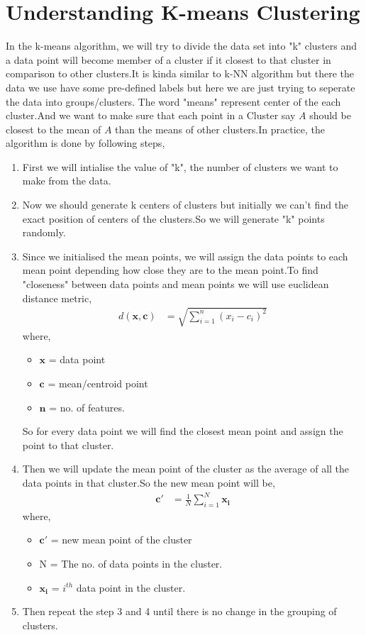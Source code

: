 \documentclass[journal,12pt,onecolumn]{IEEEtran}
\providecommand{\brak}[1]{\ensuremath{\left(#1\right)}}
\theoremstyle{remark}
\numberwithin{equation}{section}
\let\vec\mathbf
\begin{document}
	    \section{Understanding K-means Clustering}
            In the k-means algorithm, we will try to divide the data set into "k" clusters and a data point will become member of a cluster if it closest to that cluster in comparison to other clusters.It is kinda similar to k-NN algorithm but there the data we use have some pre-defined labels but here we are just trying to seperate the data into groups/clusters. The word "means" represent center of the each cluster.And we want to make sure that each point in a Cluster say $A$ should be closest to the mean of $A$ than the means of other clusters.In practice, the algorithm is done by following steps,
		    \begin{enumerate}
			\item First we will intialise the value of "k", the number of clusters we want to make from the data.
		        \item Now we should generate k centers of clusters but initially we can't find the exact position of centers of the clusters.So we will generate "k" points randomly.
		        \item Since we initialised the mean points, we will assign the data points to each mean point depending how close they are to the mean point.To find "closeness" between data points and mean points we will use euclidean distance metric,
				\begin{align}
					d\brak{\vec{x},\vec{c}} &= \sqrt{\sum_{i=1}^{n}\brak{x_i-c_i}^2}
				\end{align}
				    where,
				\begin{itemize}
					\item $\vec{x}$ = data point
					\item $\vec{c}$ = mean/centroid point
					\item $\vec{n}$ = no. of features.
				\end{itemize}
			So for every data point we will find the closest mean point and assign the point to that cluster.
			 \item Then we will update the mean point of the cluster as the average of all the data points in that cluster.So the new mean point will be,
				  \begin{align}
					  \vec{c'} &= \frac{1}{N}\sum_{i=1}^{N}\vec{x_i}
			          \end{align}
				    where,
				    \begin{itemize}
					 \item $\vec{c'}$ = new mean point of the cluster
					 \item N = The no. of data points in the cluster.
					 \item $\vec{x_i}$ = $i^{th}$ data point in the cluster.
				    \end{itemize}
			 \item Then repeat the step 3 and 4 until there is no change in the grouping of clusters.
		      \end{enumerate}
\end{document}
